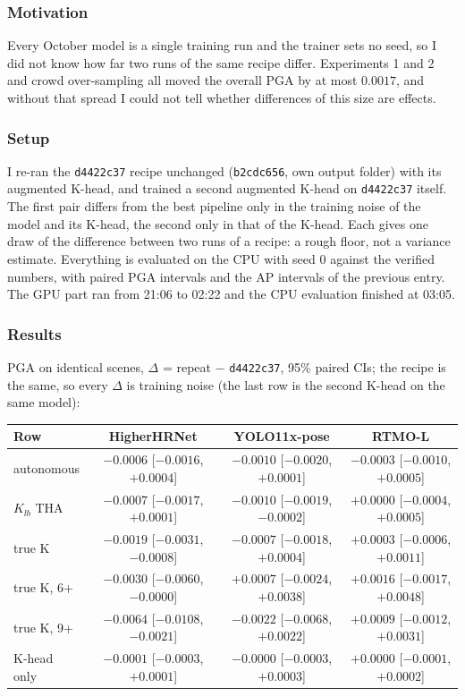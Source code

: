 \subsubsection{Motivation}

Every October model is a single training run and the trainer sets no seed, so I did not know how far two runs of the same recipe differ.
Experiments 1 and 2 and crowd over-sampling all moved the overall PGA by at most $0.0017$, and without that spread I could not tell whether differences of this size are effects.

\subsubsection{Setup}

I re-ran the \texttt{d4422c37} recipe unchanged (\texttt{b2cdc656}, own output folder) with its augmented K-head, and trained a second augmented K-head on \texttt{d4422c37} itself.
The first pair differs from the best pipeline only in the training noise of the model and its K-head, the second only in that of the K-head.
Each gives one draw of the difference between two runs of a recipe: a rough floor, not a variance estimate.
Everything is evaluated on the CPU with seed 0 against the verified numbers, with paired PGA intervals and the AP intervals of the previous entry.
The GPU part ran from 21:06 to 02:22 and the CPU evaluation finished at 03:05.

\subsubsection{Results}

PGA on identical scenes, $\Delta$ = repeat $-$ \texttt{d4422c37}, 95\% paired CIs; the recipe is the same, so every $\Delta$ is training noise (the last row is the second K-head on the same model):

{\small
\begin{tabular}{lccc}
\hline
\textbf{Row} & \textbf{HigherHRNet} & \textbf{YOLO11x-pose} & \textbf{RTMO-L} \\
\hline
autonomous   & $-0.0006$ [$-0.0016$, $+0.0004$] & $-0.0010$ [$-0.0020$, $+0.0001$] & $-0.0003$ [$-0.0010$, $+0.0005$] \\
$K_{lb}$ THA & $-0.0007$ [$-0.0017$, $+0.0001$] & $-0.0010$ [$-0.0019$, $-0.0002$] & $+0.0000$ [$-0.0004$, $+0.0005$] \\
true K       & $-0.0019$ [$-0.0031$, $-0.0008$] & $-0.0007$ [$-0.0018$, $+0.0004$] & $+0.0003$ [$-0.0006$, $+0.0011$] \\
true K, 6+   & $-0.0030$ [$-0.0060$, $-0.0000$] & $+0.0007$ [$-0.0024$, $+0.0038$] & $+0.0016$ [$-0.0017$, $+0.0048$] \\
true K, 9+   & $-0.0064$ [$-0.0108$, $-0.0021$] & $-0.0022$ [$-0.0068$, $+0.0022$] & $+0.0009$ [$-0.0012$, $+0.0031$] \\
K-head only  & $-0.0001$ [$-0.0003$, $+0.0001$] & $-0.0000$ [$-0.0003$, $+0.0003$] & $+0.0000$ [$-0.0001$, $+0.0002$] \\
\hline
\end{tabular}
}

